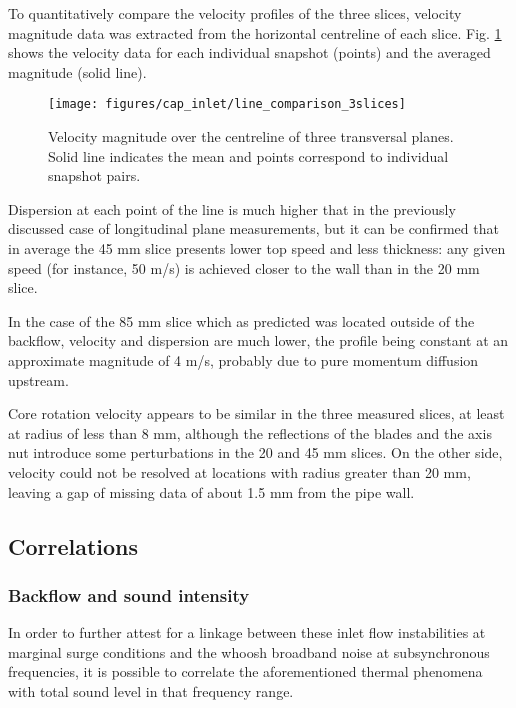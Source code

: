 To quantitatively compare the velocity profiles of the three slices, velocity magnitude data was extracted from the horizontal centreline of each slice. Fig. \ref{fig:line_comp_3slices} shows the velocity data for each individual snapshot (points) and the averaged magnitude (solid line).

\begin{figure}[htb!]
\centering
\texttt{[image: figures/cap\_inlet/line\_comparison\_3slices]}
\caption{Velocity magnitude over the centreline of three transversal planes. Solid line indicates the mean and points correspond to individual snapshot pairs.}
\label{fig:line_comp_3slices}
\end{figure}

Dispersion at each point of the line is much higher that in the previously discussed case of longitudinal plane measurements, but it can be confirmed that in average the 45 mm slice presents lower top speed and less thickness: any given speed (for instance, 50 m/s) is achieved closer to the wall than in the 20 mm slice.

In the case of the 85 mm slice which as predicted was located outside of the backflow, velocity and dispersion are much lower, the profile being constant at an approximate magnitude of 4 m/s, probably due to pure momentum diffusion upstream.

Core rotation velocity appears to be similar in the three measured slices, at least at radius of less than 8 mm, although the reflections of the blades and the axis nut introduce some perturbations in the 20 and 45 mm slices. On the other side, velocity could not be resolved at locations with radius greater than 20 mm, leaving a gap of missing data of about 1.5 mm from the pipe wall.

\subsection{Correlations}

\subsubsection{Backflow and sound intensity}

In order to further attest for a linkage between these inlet flow instabilities at marginal surge conditions and the whoosh broadband noise at subsynchronous frequencies, it is possible to correlate the aforementioned thermal phenomena with total sound level in that frequency range.

